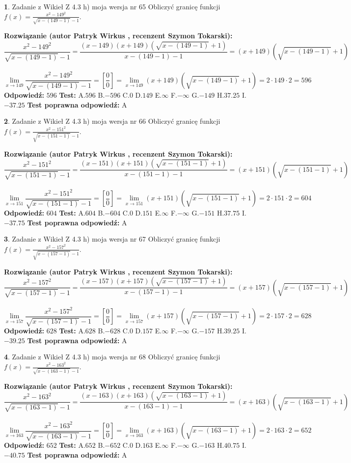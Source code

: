 \documentclass[12pt, a4paper]{article}
\theoremstyle{definition} %
\newtheorem{zad}{}
\newcommand{\zadStart}[1]{\begin{zad}#1\newline}
\newcommand{\zadStop}{\end{zad}}
\newcommand{\rozwStart}[2]{\noindent \textbf{Rozwiązanie (autor #1 , recenzent #2): }\newline}
\newcommand{\rozwStop}{\newline}
\newcommand{\odpStart}{\noindent \textbf{Odpowiedź:}\newline}
\newcommand{\odpStop}{\newline}
\newcommand{\testStart}{\noindent \textbf{Test:}\newline}
\newcommand{\testStop}{\newline}
\newcommand{\kluczStart}{\noindent \textbf{Test poprawna odpowiedź:}\newline}
\newcommand{\kluczStop}{\newline}
\begin{document}
\zadStart{Zadanie z Wikieł Z 4.3 h) moja wersja nr 65}
Obliczyć granicę funkcji $f(x)=\frac{x^{2} - 149^{2}}{\sqrt{x-(149-1)}-1}$.
\zadStop
\rozwStart{Patryk Wirkus}{Szymon Tokarski}
$$\frac{x^{2} - 149^{2}}{\sqrt{x-(149-1)}-1}=\frac{(x-149)(x+149)(\sqrt{x-(149-1)}+1)}{x-(149-1)-1}=(x+149)(\sqrt{x-(149-1)}+1)$$
\\
$$\lim\limits_{x\to 149}\frac{x^{2} - 149^{2}}{\sqrt{x-(149-1)}-1}=[\frac{0}{0}]=
\lim\limits_{x\to 149}(x+149)(\sqrt{x-(149-1)}+1) = 2\cdot149 \cdot 2 = 596$$
\rozwStop
\odpStart
$596$
\odpStop
\testStart
A.$596$
B.$-596$
C.$0$
D.$149$
E.$\infty$
F.$-\infty$
G.$-149$
H.$37.25$
I.$-37.25$
\testStop
\kluczStart
A
\kluczStop



\zadStart{Zadanie z Wikieł Z 4.3 h) moja wersja nr 66}
Obliczyć granicę funkcji $f(x)=\frac{x^{2} - 151^{2}}{\sqrt{x-(151-1)}-1}$.
\zadStop
\rozwStart{Patryk Wirkus}{Szymon Tokarski}
$$\frac{x^{2} - 151^{2}}{\sqrt{x-(151-1)}-1}=\frac{(x-151)(x+151)(\sqrt{x-(151-1)}+1)}{x-(151-1)-1}=(x+151)(\sqrt{x-(151-1)}+1)$$
\\
$$\lim\limits_{x\to 151}\frac{x^{2} - 151^{2}}{\sqrt{x-(151-1)}-1}=[\frac{0}{0}]=
\lim\limits_{x\to 151}(x+151)(\sqrt{x-(151-1)}+1) = 2\cdot151 \cdot 2 = 604$$
\rozwStop
\odpStart
$604$
\odpStop
\testStart
A.$604$
B.$-604$
C.$0$
D.$151$
E.$\infty$
F.$-\infty$
G.$-151$
H.$37.75$
I.$-37.75$
\testStop
\kluczStart
A
\kluczStop



\zadStart{Zadanie z Wikieł Z 4.3 h) moja wersja nr 67}
Obliczyć granicę funkcji $f(x)=\frac{x^{2} - 157^{2}}{\sqrt{x-(157-1)}-1}$.
\zadStop
\rozwStart{Patryk Wirkus}{Szymon Tokarski}
$$\frac{x^{2} - 157^{2}}{\sqrt{x-(157-1)}-1}=\frac{(x-157)(x+157)(\sqrt{x-(157-1)}+1)}{x-(157-1)-1}=(x+157)(\sqrt{x-(157-1)}+1)$$
\\
$$\lim\limits_{x\to 157}\frac{x^{2} - 157^{2}}{\sqrt{x-(157-1)}-1}=[\frac{0}{0}]=
\lim\limits_{x\to 157}(x+157)(\sqrt{x-(157-1)}+1) = 2\cdot157 \cdot 2 = 628$$
\rozwStop
\odpStart
$628$
\odpStop
\testStart
A.$628$
B.$-628$
C.$0$
D.$157$
E.$\infty$
F.$-\infty$
G.$-157$
H.$39.25$
I.$-39.25$
\testStop
\kluczStart
A
\kluczStop



\zadStart{Zadanie z Wikieł Z 4.3 h) moja wersja nr 68}
Obliczyć granicę funkcji $f(x)=\frac{x^{2} - 163^{2}}{\sqrt{x-(163-1)}-1}$.
\zadStop
\rozwStart{Patryk Wirkus}{Szymon Tokarski}
$$\frac{x^{2} - 163^{2}}{\sqrt{x-(163-1)}-1}=\frac{(x-163)(x+163)(\sqrt{x-(163-1)}+1)}{x-(163-1)-1}=(x+163)(\sqrt{x-(163-1)}+1)$$
\\
$$\lim\limits_{x\to 163}\frac{x^{2} - 163^{2}}{\sqrt{x-(163-1)}-1}=[\frac{0}{0}]=
\lim\limits_{x\to 163}(x+163)(\sqrt{x-(163-1)}+1) = 2\cdot163 \cdot 2 = 652$$
\rozwStop
\odpStart
$652$
\odpStop
\testStart
A.$652$
B.$-652$
C.$0$
D.$163$
E.$\infty$
F.$-\infty$
G.$-163$
H.$40.75$
I.$-40.75$
\testStop
\kluczStart
A
\kluczStop
\end{document}
